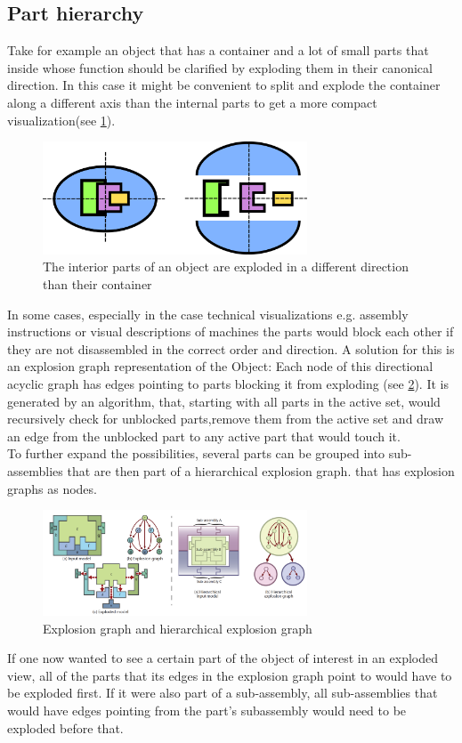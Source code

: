 \subsection{Part hierarchy}
Take for example an object that has a container and a lot of small parts that inside whose function should be clarified by exploding them in their canonical direction.  In this case it might be convenient to split and explode the container along a different axis than the internal parts to get a more compact visualization(see \ref{fig:axes}).\\
\begin{figure}[tb]
	\centering
	\includegraphics[width=0.7\textwidth]{chapters/figures/axes}
	\caption{The interior parts of an object are exploded in a different direction than their container}
	\label{fig:axes}
\end{figure}
In some cases, especially in the case technical visualizations e.g. assembly instructions or visual descriptions of machines the parts would block each other if they are not disassembled in the correct order and direction. A solution for this is an explosion graph representation of the Object\cite{proc:Li:2008:AGI}: Each node of this directional acyclic graph has edges pointing to parts blocking it from exploding (see \ref{fig:hierarchy}). It is generated by an algorithm, that, starting with all parts in the active set, would recursively check for unblocked parts,remove them from the active set and draw an edge from the unblocked part to any active part that would touch it.\\
To further expand the possibilities, several parts can be grouped into sub-assemblies that are then part of a hierarchical explosion graph. that has explosion graphs as nodes.\\
\begin{figure}[tb]
	\centering
	\includegraphics[width=0.7\textwidth]{chapters/figures/hierarchy}
	\caption{Explosion graph and hierarchical explosion graph\cite{proc:Li:2008:AGI}}
	\label{fig:hierarchy}
\end{figure}
If one now wanted to see a certain part of the object of interest in an exploded view, all of the parts that its edges in the explosion graph point to would have to be exploded first. If it were also part of a sub-assembly, all sub-assemblies that would have edges pointing from the part's subassembly would need to be exploded before that.
